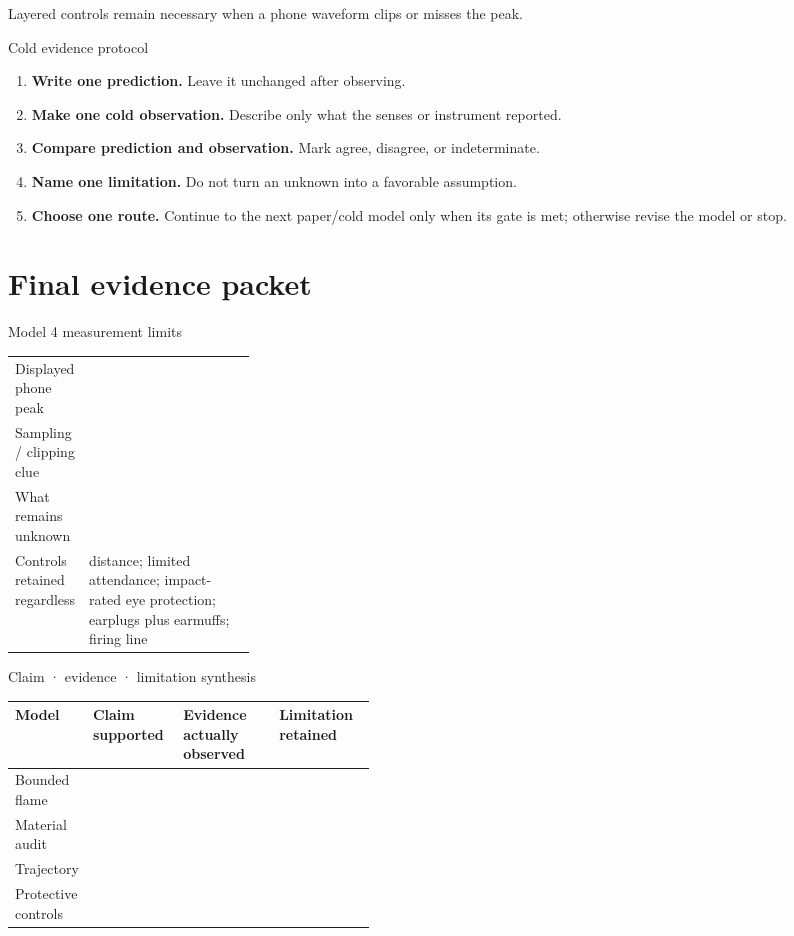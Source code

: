 {Layered controls remain necessary when a phone waveform clips or misses the peak.}

\begin{teloscard}{Cold evidence protocol}
\begin{enumerate}
\item \textbf{Write one prediction.} Leave it unchanged after observing.
\item \textbf{Make one cold observation.} Describe only what the senses or
instrument reported.
\item \textbf{Compare prediction and observation.} Mark agree, disagree, or
indeterminate.
\item \textbf{Name one limitation.} Do not turn an unknown into a favorable
assumption.
\item \textbf{Choose one route.} Continue to the next paper/cold model only when
its gate is met; otherwise revise the model or stop.
\end{enumerate}
\end{teloscard}

\clearpage
\section{Final evidence packet}
\begin{teloscard}{Model 4 measurement limits}
\begin{tabularx}{\linewidth}{@{}p{0.28\linewidth}L@{}}
Displayed phone peak & \hrulefill\\[.8em]
Sampling / clipping clue & \hrulefill\\[.8em]
What remains unknown & \hrulefill\\[.8em]
Controls retained regardless & distance; limited attendance; impact-rated eye
protection; earplugs plus earmuffs; firing line\\
\end{tabularx}
\end{teloscard}

\begin{teloscard}{Claim · evidence · limitation synthesis}
\begin{tabularx}{\linewidth}{@{}p{0.17\linewidth}p{0.25\linewidth}L L@{}}
\textbf{Model} & \textbf{Claim supported} & \textbf{Evidence actually observed} &
\textbf{Limitation retained}\\ \midrule
Bounded flame &&&\\[1.35em]
Material audit &&&\\[1.35em]
Trajectory &&&\\[1.35em]
Protective controls &&&\\
\end{tabularx}
\end{teloscard}

